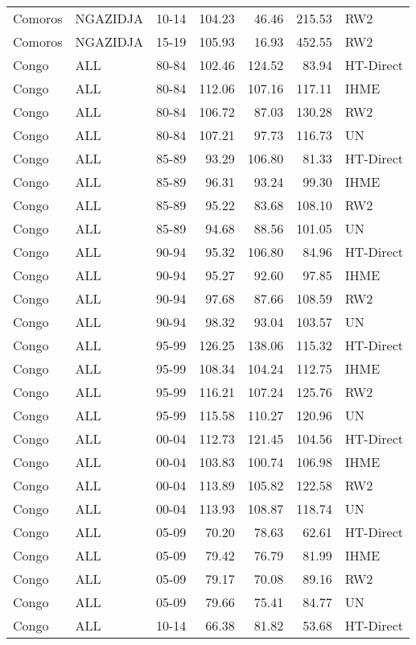 \begin{longtable}{lllrrrl}
  Comoros & NGAZIDJA & 10-14 & 104.23 & 46.46 & 215.53 & RW2 \\ 
  Comoros & NGAZIDJA & 15-19 & 105.93 & 16.93 & 452.55 & RW2 \\ 
  Congo & ALL & 80-84 & 102.46 & 124.52 & 83.94 & HT-Direct \\ 
  Congo & ALL & 80-84 & 112.06 & 107.16 & 117.11 & IHME \\ 
  Congo & ALL & 80-84 & 106.72 & 87.03 & 130.28 & RW2 \\ 
  Congo & ALL & 80-84 & 107.21 & 97.73 & 116.73 & UN \\ 
  Congo & ALL & 85-89 & 93.29 & 106.80 & 81.33 & HT-Direct \\ 
  Congo & ALL & 85-89 & 96.31 & 93.24 & 99.30 & IHME \\ 
  Congo & ALL & 85-89 & 95.22 & 83.68 & 108.10 & RW2 \\ 
  Congo & ALL & 85-89 & 94.68 & 88.56 & 101.05 & UN \\ 
  Congo & ALL & 90-94 & 95.32 & 106.80 & 84.96 & HT-Direct \\ 
  Congo & ALL & 90-94 & 95.27 & 92.60 & 97.85 & IHME \\ 
  Congo & ALL & 90-94 & 97.68 & 87.66 & 108.59 & RW2 \\ 
  Congo & ALL & 90-94 & 98.32 & 93.04 & 103.57 & UN \\ 
  Congo & ALL & 95-99 & 126.25 & 138.06 & 115.32 & HT-Direct \\ 
  Congo & ALL & 95-99 & 108.34 & 104.24 & 112.75 & IHME \\ 
  Congo & ALL & 95-99 & 116.21 & 107.24 & 125.76 & RW2 \\ 
  Congo & ALL & 95-99 & 115.58 & 110.27 & 120.96 & UN \\ 
  Congo & ALL & 00-04 & 112.73 & 121.45 & 104.56 & HT-Direct \\ 
  Congo & ALL & 00-04 & 103.83 & 100.74 & 106.98 & IHME \\ 
  Congo & ALL & 00-04 & 113.89 & 105.82 & 122.58 & RW2 \\ 
  Congo & ALL & 00-04 & 113.93 & 108.87 & 118.74 & UN \\ 
  Congo & ALL & 05-09 & 70.20 & 78.63 & 62.61 & HT-Direct \\ 
  Congo & ALL & 05-09 & 79.42 & 76.79 & 81.99 & IHME \\ 
  Congo & ALL & 05-09 & 79.17 & 70.08 & 89.16 & RW2 \\ 
  Congo & ALL & 05-09 & 79.66 & 75.41 & 84.77 & UN \\ 
  Congo & ALL & 10-14 & 66.38 & 81.82 & 53.68 & HT-Direct \\ 

\end{longtable}
